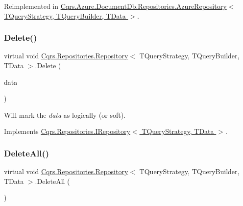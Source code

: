 Reimplemented in \hyperlink{classCqrs_1_1Azure_1_1DocumentDb_1_1Repositories_1_1AzureRepository_ac9ceeed80a02ced9a45b3443cd1f453f}{Cqrs.\+Azure.\+Document\+Db.\+Repositories.\+Azure\+Repository$<$ T\+Query\+Strategy, T\+Query\+Builder, T\+Data $>$}.

\mbox{\label{classCqrs_1_1Repositories_1_1Repository_ac9d88baa6afcea85553fd233ba406e48}} 
\subsubsection{\texorpdfstring{Delete()}{Delete()}}
{\footnotesize\ttfamily virtual void \hyperlink{classCqrs_1_1Repositories_1_1Repository}{Cqrs.\+Repositories.\+Repository}$<$ T\+Query\+Strategy, T\+Query\+Builder, T\+Data $>$.Delete (\begin{DoxyParamCaption}\item[{T\+Data}]{data }\end{DoxyParamCaption})\hspace{0.3cm}{\ttfamily [virtual]}}



Will mark the {\itshape data}  as logically (or soft). 



Implements \hyperlink{interfaceCqrs_1_1Repositories_1_1IRepository_a71c60de3588a757da2d25350c98374fd}{Cqrs.\+Repositories.\+I\+Repository$<$ T\+Query\+Strategy, T\+Data $>$}.

\mbox{\label{classCqrs_1_1Repositories_1_1Repository_a6b6b50d476a351fc7fbd194cb8fa44d0}} 
\subsubsection{\texorpdfstring{Delete\+All()}{DeleteAll()}}
{\footnotesize\ttfamily virtual void \hyperlink{classCqrs_1_1Repositories_1_1Repository}{Cqrs.\+Repositories.\+Repository}$<$ T\+Query\+Strategy, T\+Query\+Builder, T\+Data $>$.Delete\+All (\begin{DoxyParamCaption}{ }\end{DoxyParamCaption})\hspace{0.3cm}{\ttfamily [virtual]}}



